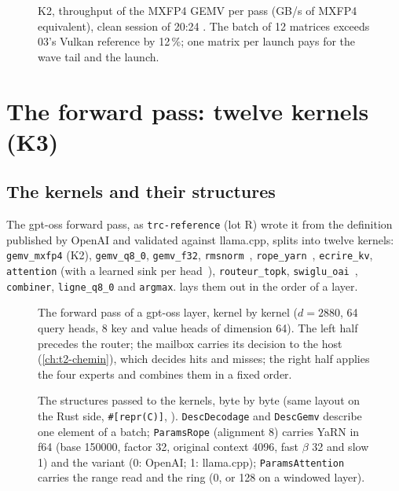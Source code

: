 \begin{figure}[!htbp]
\centering
\GrapheNoyGemv
\caption[K2: throughput of the MXFP4 GEMV]{K2, throughput of the MXFP4 GEMV per pass (GB/s of MXFP4 equivalent), clean session of 20:24 \mes. The batch of 12 matrices exceeds 03's Vulkan reference by 12\,\%; one matrix per launch pays for the wave tail and the launch.}
\label{fig:t2n-gemv}
\end{figure}

\section{The forward pass: twelve kernels (K3)}\label{sec:t2n-passe}

\subsection{The kernels and their structures}

The gpt-oss forward pass, as \texttt{trc-reference} (lot R) wrote it from the definition published by OpenAI and validated against llama.cpp, splits into twelve kernels: \texttt{gemv\_mxfp4} (K2), \texttt{gemv\_q8\_0}, \texttt{gemv\_f32}, \texttt{rmsnorm}~\cite{zhang2019rmsnorm}, \texttt{rope\_yarn}~\cite{su2021roformer,peng2023yarn}, \texttt{ecrire\_kv}, \texttt{attention} (with a learned sink per head~\cite{xiao2024sinks}), \texttt{routeur\_topk}, \texttt{swiglu\_oai}~\cite{shazeer2020glu}, \texttt{combiner}, \texttt{ligne\_q8\_0} and \texttt{argmax}.  lays them out in the order of a layer.

\begin{figure}[!htbp]
\centering
\resizebox{\linewidth}{!}{\SchemaNoyPasse}
\caption[The forward pass of a layer, kernel by kernel]{The forward pass of a gpt-oss layer, kernel by kernel ($d = \num{2880}$, 64 query heads, 8 key and value heads of dimension 64). The left half precedes the router; the mailbox carries its decision to the host (\cref{ch:t2-chemin}), which decides hits and misses; the right half applies the four experts and combines them in a fixed order.}
\label{fig:t2n-passe}
\end{figure}

\begin{figure}[!htbp]
\centering
\resizebox{\linewidth}{!}{\SchemaNoyStructures}
\caption[The structures passed to the kernels]{The structures passed to the kernels, byte by byte (same layout on the Rust side, \texttt{\#[repr(C)]}, ). \texttt{DescDecodage} and \texttt{DescGemv} describe one element of a batch; \texttt{ParamsRope} (alignment 8) carries YaRN in f64 (base \num{150000}, factor 32, original context \num{4096}, fast $\beta$ 32 and slow 1) and the variant (0: OpenAI; 1: llama.cpp); \texttt{ParamsAttention} carries the range read and the ring (0, or 128 on a windowed layer).}
\label{fig:t2n-structures}
\end{figure}

